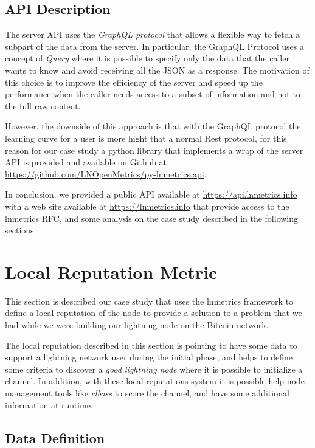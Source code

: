 \subsection{API Description}

The server API uses the \emph{GraphQL protocol} that allows a flexible way to fetch
a subpart of the data from the server. In particular, the GraphQL Protocol uses
a concept of \emph{Query} where it is possible to specify only the data that the 
caller wants to know and avoid receiving all the JSON as a response. The motivation of this 
choice is to improve the efficiency of the server and speed up the performance when the caller needs 
access to a subset of information and not to the full raw content. 

However, the downside of this approach is that with the GraphQL protocol the learning 
curve for a user is more hight that a normal Rest protocol, for this reason for our
case study a python library that implements a wrap of the server API is provided 
and available on Github at \url{https://github.com/LNOpenMetrics/py-lnmetrics.api}. 

In conclusion, we provided a public API available at \url{https://api.lnmetrics.info} with 
a web site available at \url{https://lnmetrics.info} that provide access to the 
lnmetrics RFC, and some analysis on the case study described in the 
following sections.

\section{Local Reputation Metric}
\label{sec:demo}

This section is described our case study that uses the lnmetrics framework to 
define a local reputation of the node to provide a solution to a problem 
that we had while we were building our lightning node on the Bitcoin network.

The local reputation described in this section is pointing to have some data 
to support a lightning network user during the initial phase, and 
helps to define some criteria to discover a \emph{good lightning node} 
where it is possible to initialize a channel. In addition, with these local reputations 
system it is possible help node management tools like \emph{clboss}\cite{clboss}
to score the channel, and have some additional information at runtime.

\subsection{Data Definition}
\label{sec:data_definition_datadef}

